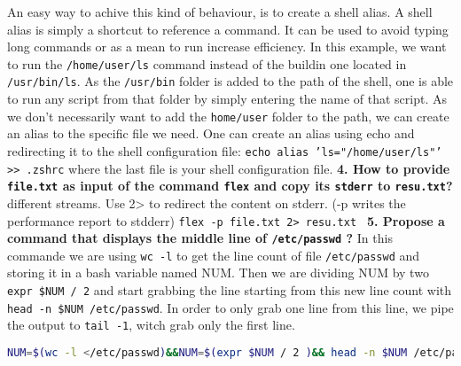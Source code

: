 \documentclass[a4paper,oneside,onecolumn]{article}
\newcommand{\code}[1]{\colorbox{codegray}{\texttt{#1}}}
\begin{document}
\newline
\newline
An easy way to achive this kind of behaviour, is to create a shell alias. A shell alias is simply a shortcut to reference a command. It can be used to avoid typing long commands or as a mean to run increase efficiency.
In this example, we want to run the \texttt{/home/user/ls} command instead of the buildin one located in \texttt{/usr/bin/ls}. As the \texttt{/usr/bin} folder is added to the path of the shell, one is able to run any script from that folder by simply entering the name of that script.
\newline
As we don't necessarily want to add the \texttt{home/user} folder to the path, we can create an alias to the specific file we need. 
\newline
\newline
One can create an alias using echo and redirecting it to the shell configuration file: 
\newline
\code{echo alias 'ls="/home/user/ls"' >> .zshrc} where the last file is your shell configuration file.
\newline
\newline
\noindent
\textbf{4. How to provide \texttt{file.txt} as input of the command \code{flex} and copy its \texttt{stderr} to \texttt{resu.txt}?}
\newline
{} different streams. Use 2> to redirect the content on stderr. (-p writes the performance report to stdderr)
\newline
\code{flex -p file.txt 2> resu.txt }
\newline
\newline
\noindent
\textbf{5. Propose a command that displays the middle line of \texttt{/etc/passwd} ?}
\newline
\newline
In this commande we are using \code{wc -l} to get the line count of file \texttt{/etc/passwd} and storing it in a bash variable named NUM. Then we are dividing NUM by two \code{expr \$NUM / 2} and start grabbing the line starting from this new line count with \code{head -n \$NUM /etc/passwd}. In order to only grab one line from this line, we pipe the output to \code{tail -1}, witch grab only the first line.
\newline
\begin{lstlisting}[language=bash]
NUM=$(wc -l </etc/passwd)&&NUM=$(expr $NUM / 2 )&& head -n $NUM /etc/passwd | tail -1
\end{lstlisting}
\end{document}
